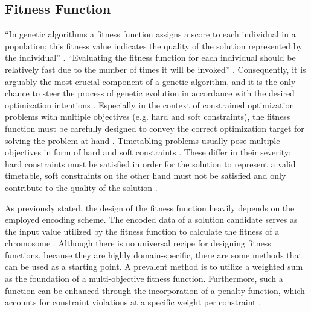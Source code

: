 \documentclass[sigconf]{acmart}
\begin{document}
\subsection{Fitness Function}
\enquote{In genetic algorithms a fitness function assigns a score to each
individual in a population; this fitness value indicates the quality of the
solution represented by the individual} \cite{Affenzeller2009}.
\enquote{Evaluating the fitness function for each individual should be
relatively fast due to the number of times it will be invoked}
\cite{Affenzeller2009}.
Consequently, it is arguably the most crucial component of a genetic algorithm,
and it is the only chance to steer the process of genetic evolution in
accordance with the desired optimization intentions
\cite{Beligiannis2009,kinnear1994perspective}.
Especially in the context of constrained optimization problems with multiple
objectives (e.g. hard and soft constraints), the fitness function must be
carefully designed to convey the correct optimization target for solving the
problem at hand \cite{Beligiannis2009,Carr2014}.
Timetabling problems usually pose multiple objectives in form of hard and
soft constraints \cite{Beligiannis2009}. These differ in their severity:
hard constraints must be satisfied in order for the solution to represent a
valid timetable, soft constraints on the other hand must not be satisfied and
only contribute to the quality of the solution \cite{Beligiannis2009}.

As previously stated, the design of the fitness function heavily depends on the
employed encoding scheme. The encoded data of a solution candidate serves as
the input value utilized by the fitness function to calculate the fitness of a
chromosome \cite{Affenzeller2009}. Although there is no universal recipe for
designing fitness functions, because they are highly domain-specific,
there are some methods that can be used as a starting point.
A prevalent method is to utilize a weighted sum as the foundation of a
multi-objective fitness function. Furthermore, such a function can be enhanced
through the incorporation of a penalty function, which accounts for constraint
violations at a specific weight per constraint \cite{Beligiannis2009}.



\end{document}
